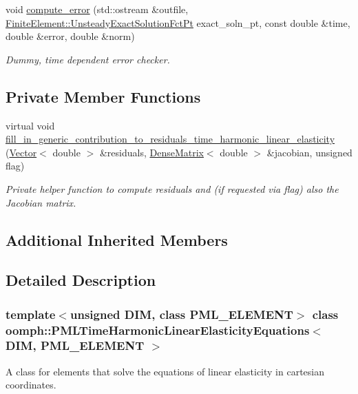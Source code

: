 \begin{DoxyCompactItemize}
void \hyperlink{classoomph_1_1PMLTimeHarmonicLinearElasticityEquations_a5260b08e4acb416b0ca815097d8da246}{compute\+\_\+error} (std\+::ostream \&outfile, \hyperlink{classoomph_1_1FiniteElement_ad4ecf2b61b158a4b4d351a60d23c633e}{Finite\+Element\+::\+Unsteady\+Exact\+Solution\+Fct\+Pt} exact\+\_\+soln\+\_\+pt, const double \&time, double \&error, double \&norm)
\begin{DoxyCompactList}\small\item\em Dummy, time dependent error checker. \end{DoxyCompactList}\end{DoxyCompactItemize}
\subsection*{Private Member Functions}
\begin{DoxyCompactItemize}
\item 
virtual void \hyperlink{classoomph_1_1PMLTimeHarmonicLinearElasticityEquations_a18ad8f22b1d4c8055d09e7fd9e87df4d}{fill\+\_\+in\+\_\+generic\+\_\+contribution\+\_\+to\+\_\+residuals\+\_\+time\+\_\+harmonic\+\_\+linear\+\_\+elasticity} (\hyperlink{classoomph_1_1Vector}{Vector}$<$ double $>$ \&residuals, \hyperlink{classoomph_1_1DenseMatrix}{Dense\+Matrix}$<$ double $>$ \&jacobian, unsigned flag)
\begin{DoxyCompactList}\small\item\em Private helper function to compute residuals and (if requested via flag) also the Jacobian matrix. \end{DoxyCompactList}\end{DoxyCompactItemize}
\subsection*{Additional Inherited Members}


\subsection{Detailed Description}
\subsubsection*{template$<$unsigned D\+IM, class P\+M\+L\+\_\+\+E\+L\+E\+M\+E\+NT$>$\newline
class oomph\+::\+P\+M\+L\+Time\+Harmonic\+Linear\+Elasticity\+Equations$<$ D\+I\+M, P\+M\+L\+\_\+\+E\+L\+E\+M\+E\+N\+T $>$}

A class for elements that solve the equations of linear elasticity in cartesian coordinates. 

